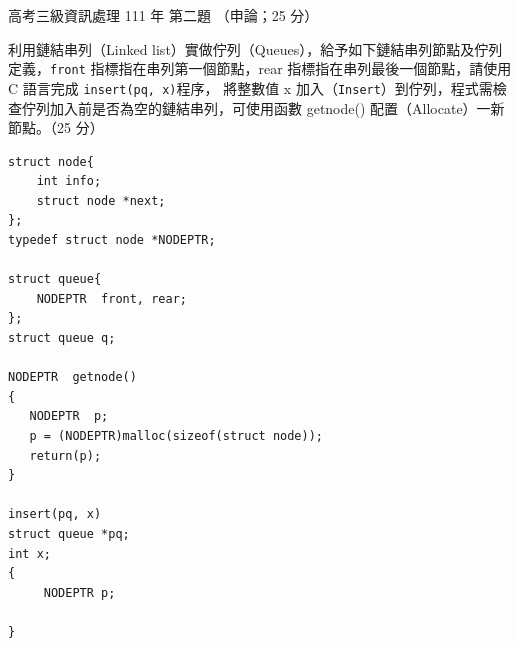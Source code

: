 \begin{pastexam}[label={px:gk3-111-ds-02}]{高考三級資訊處理 111 年 第二題}
（申論；25 分）

利用鏈結串列（Linked list）實做佇列（Queues），給予如下鏈結串列節點及佇列定義，\texttt{front}
指標指在串列第一個節點，rear 指標指在串列最後一個節點，請使用 C 語言完成 \texttt{insert(pq, x)}程序，
將整數值 x 加入（\texttt{Insert}）到佇列，程式需檢查佇列加入前是否為空的鏈結串列，可使用函數
getnode() 配置（Allocate）一新節點。（25 分）
\begin{verbatim}
struct node{
    int info;
    struct node *next;
};
typedef struct node *NODEPTR;

struct queue{
    NODEPTR  front, rear;
};
struct queue q;

NODEPTR  getnode()
{
   NODEPTR  p;
   p = (NODEPTR)malloc(sizeof(struct node));
   return(p);
}

insert(pq, x)
struct queue *pq;
int x;
{
     NODEPTR p;

}
\end{verbatim}
\end{pastexam}

